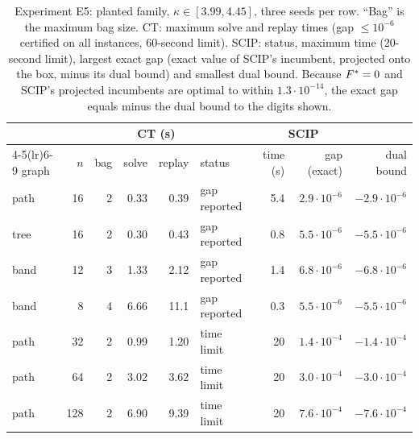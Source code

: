 \begin{table}[t]
\centering\small
\setlength{\tabcolsep}{4pt}
\caption{Experiment E5: planted family, $\kappa\in[3.99,4.45]$, three seeds per
row. ``Bag'' is the maximum bag size. CT: maximum solve and replay times
(gap $\le10^{-6}$ certified on all instances, 60-second limit). SCIP: status,
maximum time (20-second limit), largest exact gap (exact value of SCIP's
incumbent, projected onto the box, minus its dual bound) and smallest dual
bound. Because $F^{*}=0$ and SCIP's projected incumbents are optimal to within
$1.3\cdot10^{-14}$, the exact gap equals minus the dual bound to the digits
shown.}\label{tab:scip}
\begin{tabular}{lrrrrlrrr}
\toprule
&&&\multicolumn{2}{c}{CT (s)}&\multicolumn{4}{c}{SCIP}\\
\cmidrule(lr){4-5}\cmidrule(lr){6-9}
graph & $n$ & bag & solve & replay & status & time (s) & gap (exact) & dual bound\\
\midrule
path & 16 & 2 & 0.33 & 0.39 & gap reported & 5.4 & $2.9\cdot10^{-6}$ & $-2.9\cdot10^{-6}$\\
tree & 16 & 2 & 0.30 & 0.43 & gap reported & 0.8 & $5.5\cdot10^{-6}$ & $-5.5\cdot10^{-6}$\\
band & 12 & 3 & 1.33 & 2.12 & gap reported & 1.4 & $6.8\cdot10^{-6}$ & $-6.8\cdot10^{-6}$\\
band & 8 & 4 & 6.66 & 11.1 & gap reported & 0.3 & $5.5\cdot10^{-6}$ & $-5.5\cdot10^{-6}$\\
path & 32 & 2 & 0.99 & 1.20 & time limit & 20 & $1.4\cdot10^{-4}$ & $-1.4\cdot10^{-4}$\\
path & 64 & 2 & 3.02 & 3.62 & time limit & 20 & $3.0\cdot10^{-4}$ & $-3.0\cdot10^{-4}$\\
path & 128 & 2 & 6.90 & 9.39 & time limit & 20 & $7.6\cdot10^{-4}$ & $-7.6\cdot10^{-4}$\\
\bottomrule
\end{tabular}
\end{table}

